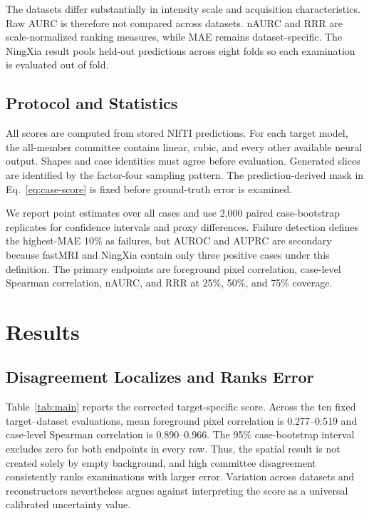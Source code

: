 \documentclass[twocolumn]{article}
\begin{document}
The datasets differ substantially in intensity scale and acquisition characteristics. Raw AURC is therefore not compared across datasets. nAURC and RRR are scale-normalized ranking measures, while MAE remains dataset-specific. The NingXia result pools held-out predictions across eight folds so each examination is evaluated out of fold.

\subsection{Protocol and Statistics}

All scores are computed from stored NIfTI predictions. For each target model, the all-member committee contains linear, cubic, and every other available neural output. Shapes and case identities must agree before evaluation. Generated slices are identified by the factor-four sampling pattern. The prediction-derived mask in Eq.~\eqref{eq:case-score} is fixed before ground-truth error is examined.

We report point estimates over all cases and use 2,000 paired case-bootstrap replicates for confidence intervals and proxy differences. Failure detection defines the highest-MAE 10\% as failures, but AUROC and AUPRC are secondary because fastMRI and NingXia contain only three positive cases under this definition. The primary endpoints are foreground pixel correlation, case-level Spearman correlation, nAURC, and RRR at 25\%, 50\%, and 75\% coverage.

\section{Results}

\subsection{Disagreement Localizes and Ranks Error}

Table~\ref{tab:main} reports the corrected target-specific score. Across the ten fixed target--dataset evaluations, mean foreground pixel correlation is 0.277--0.519 and case-level Spearman correlation is 0.890--0.966. The 95\% case-bootstrap interval excludes zero for both endpoints in every row. Thus, the spatial result is not created solely by empty background, and high committee disagreement consistently ranks examinations with larger error. Variation across datasets and reconstructors nevertheless argues against interpreting the score as a universal calibrated uncertainty value.
\end{document}
